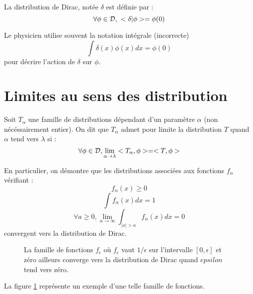 \documentclass[12pt]{book}
\begin{document}
\begin{defn}
La distribution de Dirac, not\'ee $\delta$ est d\'efinie par :
\begin{equation}
\forall \phi \in {\cal D},\ <\delta|\phi>=\phi(0)
\end{equation}
\end{defn}
\begin{rem}
Le physicien utilise souvent la notation int\'egrale (incorrecte)
\begin{equation}
\int \delta(x)\phi(x)dx=\phi(0)
\end{equation}
pour d\'ecrire l'action de $\delta$ sur $\phi$.
\end{rem}
\section{Limites au sens des distribution}
\begin{defn}
Soit $T_\alpha$ une famille de distributions d\'ependant d'un
param\`etre $\alpha$ (non n\'ec\'essairement entier). On dit que
$T_\alpha$ admet pour limite la distribution $T$ quand $\alpha$ tend
vers $\lambda$ si :
\begin{equation}
\forall \phi \in {\cal D},
\lim_{\alpha\rightarrow\lambda}<T_\alpha,\phi>=<T,\phi> 
\end{equation}
\end{defn}
En particulier, on d\'emontre que les distributions associ\'ees aux
fonctions $f_\alpha$ v\'erifiant :
\begin{equation}
f_\alpha(x)\geq 0
\end{equation}
\begin{equation}
\int f_\alpha(x)dx=1
\end{equation}
\begin{equation}
\forall a\geq 0,
\lim_{\alpha\rightarrow\infty}\int_{|x|>a}f_\alpha(x)dx=0 
\end{equation}
convergent vers la distribution de Dirac.
\begin{figure}[htb]
 \centerline{}   
 \caption{La famille de fonctions $f_\epsilon$ o\`u $f_\epsilon$ vaut
$1/\epsilon$ sur l'intervalle $[0,\epsilon]$ et z\'ero ailleurs
converge vers la distribution de Dirac quand $epsilon$ tend vers
z\'ero.  }
 \label{figdirac}
\end{figure}
La figure \ref{figdirac} repr\'esente un exemple d'une telle famille
de fonctions.
\end{document}
